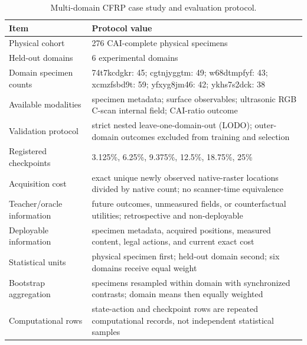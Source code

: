 \begin{table}[t]
\centering
\caption{Multi-domain CFRP case study and evaluation protocol.}
\label{tab:case-protocol}
\small
\begin{tabularx}{\textwidth}{@{}p{}X@{}}
\toprule
Item & Protocol value \\
\midrule
Physical cohort & 276 CAI-complete physical specimens \\
Held-out domains & 6 experimental domains \\
Domain specimen counts & 74t7kcdgkr: 45; cgtnjyggtm: 49; w68dtmpfyf: 43; xcmzfsbd9t: 59; yfxyg8jm46: 42; ykhs7s2dck: 38 \\
Available modalities & specimen metadata; surface observables; ultrasonic RGB C-scan internal field; CAI-ratio outcome \\
Validation protocol & strict nested leave-one-domain-out (LODO); outer-domain outcomes excluded from training and selection \\
Registered checkpoints & 3.125\%, 6.25\%, 9.375\%, 12.5\%, 18.75\%, 25\% \\
Acquisition cost & exact unique newly observed native-raster locations divided by native count; no scanner-time equivalence \\
Teacher/oracle information & future outcomes, unmeasured fields, or counterfactual utilities; retrospective and non-deployable \\
Deployable information & specimen metadata, acquired positions, measured content, legal actions, and current exact cost \\
Statistical units & physical specimen first; held-out domain second; six domains receive equal weight \\
Bootstrap aggregation & specimens resampled within domain with synchronized contrasts; domain means then equally weighted \\
Computational rows & state-action and checkpoint rows are repeated computational records, not independent statistical samples \\
\bottomrule
\end{tabularx}
\end{table}
